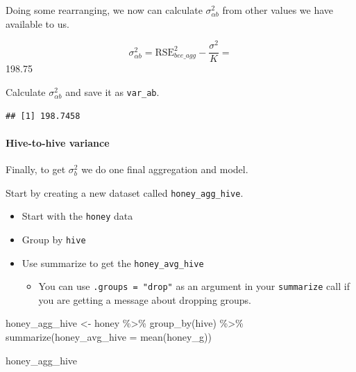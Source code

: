 \documentclass[
  openany]{book}
\newenvironment{Shaded}{\begin{snugshade}}{\end{snugshade}}
\newcommand{\AttributeTok}[1]{\textcolor[rgb]{0.77,0.63,0.00}{#1}}
\newcommand{\DecValTok}[1]{\textcolor[rgb]{0.00,0.00,0.81}{#1}}
\newcommand{\FunctionTok}[1]{\textcolor[rgb]{0.00,0.00,0.00}{#1}}
\newcommand{\NormalTok}[1]{#1}
\newcommand{\OtherTok}[1]{\textcolor[rgb]{0.56,0.35,0.01}{#1}}
\newcommand{\SpecialCharTok}[1]{\textcolor[rgb]{0.00,0.00,0.00}{#1}}
\providecommand{\tightlist}{%
  \setlength{\itemsep}{0pt}\setlength{\parskip}{0pt}}
\begin{document}
Doing some rearranging, we now can calculate \(\sigma_{\alpha b}^2\) from other values we have available to us.

\[\sigma_{\alpha b}^2 = \text{RSE}_{bee\_agg}^2 - \frac{\sigma^2}{K} = \] 198.75

Calculate \(\sigma_{\alpha b}^2\) and save it as \texttt{var\_ab}.

\begin{Shaded}
\end{Shaded}

\begin{verbatim}
## [1] 198.7458
\end{verbatim}

\hypertarget{hive-to-hive-variance}{%
\paragraph{Hive-to-hive variance}\label{hive-to-hive-variance}}

Finally, to get \(\sigma^2_{b}\) we do one final aggregation and model.

Start by creating a new dataset called \texttt{honey\_agg\_hive}.

\begin{itemize}
\tightlist
\item
  Start with the \texttt{honey} data\\
\item
  Group by \texttt{hive}\\
\item
  Use summarize to get the \texttt{honey\_avg\_hive}

  \begin{itemize}
  \tightlist
  \item
    You can use \texttt{.groups\ =\ "drop"} as an argument in your \texttt{summarize} call if you are getting a message about dropping groups.
  \end{itemize}
\end{itemize}

\begin{Shaded}
\begin{Highlighting}[]
\NormalTok{honey\_agg\_hive }\OtherTok{\textless{}{-}}\NormalTok{ honey }\SpecialCharTok{\%\textgreater{}\%} 
  \FunctionTok{group\_by}\NormalTok{(hive) }\SpecialCharTok{\%\textgreater{}\%} 
  \FunctionTok{summarize}\NormalTok{(}\AttributeTok{honey\_avg\_hive =} \FunctionTok{mean}\NormalTok{(honey\_g))}

\NormalTok{honey\_agg\_hive}
\end{Highlighting}
\end{Shaded}
\end{document}
